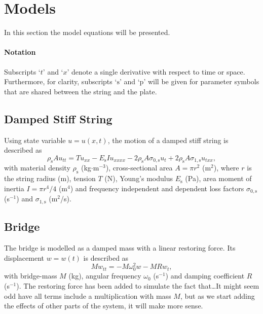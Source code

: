 \documentclass[reprint,NumberedRefs]{JASAnew}
\begin{document}
\section{Models}
In this section the model equations will be presented. 
\paragraph{Notation}
Subscripts `$t$' and `$x$' denote a single derivative with respect to time or space. Furthermore, for clarity, subscripts `$\text{s}$' and `$\text{p}$' will be given for parameter symbols that are shared between the string and the plate.
\subsection{Damped Stiff String}
Using state variable $u=u(x,t)$, the motion of a damped stiff string is described as
\begin{equation}
    \rho_\text{s} A u_{tt} = Tu_{xx} - E_\text{s}Iu_{xxxx}-2\rho_\text{s}A\sigma_{0,\text{s}}u_t+2\rho_\text{s}A\sigma_{1,\text{s}}u_{txx},
\end{equation}
with material density $\rho_\text{s}$ (kg$\cdot$m$^{-3}$), cross-sectional area $A = \pi r^2$ (m$^2$), where $r$ is the string radius (m), tension $T$ (N), Young's modulus $E_\text{s}$ (Pa), area moment of inertia $I = \pi r^4 / 4$ (m$^4$) and frequency independent and dependent loss factors $\sigma_{0,\text{s}}$ (s$^{-1}$) and $\sigma_{1,\text{s}}$ (m$^2$/s).
\subsection{Bridge}
The bridge is modelled as a damped mass with a linear restoring force. Its displacement $w=w(t)$ is described as
\begin{equation}
    Mw_{tt}=-M\omega_0^2w-MRw_t,
\end{equation}
with bridge-mass $M$ (kg), angular frequency $\omega_0$ (s$^{-1}$) and damping coefficient $R$ (s$^{-1}$). The restoring force has been added to simulate the fact that\dots  It might seem odd have all terms include a multiplication with mass $M$, but as we start adding the effects of other parts of the system, it will make more sense.
\end{document}
